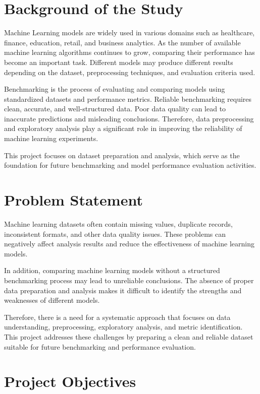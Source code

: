 \documentclass[12pt,a4paper]{report}
\begin{document}
\section{Background of the Study}

Machine Learning models are widely used in various domains such as healthcare, finance, education, retail, and business analytics. As the number of available machine learning algorithms continues to grow, comparing their performance has become an important task. Different models may produce different results depending on the dataset, preprocessing techniques, and evaluation criteria used.

Benchmarking is the process of evaluating and comparing models using standardized datasets and performance metrics. Reliable benchmarking requires clean, accurate, and well-structured data. Poor data quality can lead to inaccurate predictions and misleading conclusions. Therefore, data preprocessing and exploratory analysis play a significant role in improving the reliability of machine learning experiments.

This project focuses on dataset preparation and analysis, which serve as the foundation for future benchmarking and model performance evaluation activities.

\section{Problem Statement}

Machine learning datasets often contain missing values, duplicate records, inconsistent formats, and other data quality issues. These problems can negatively affect analysis results and reduce the effectiveness of machine learning models.

In addition, comparing machine learning models without a structured benchmarking process may lead to unreliable conclusions. The absence of proper data preparation and analysis makes it difficult to identify the strengths and weaknesses of different models.

Therefore, there is a need for a systematic approach that focuses on data understanding, preprocessing, exploratory analysis, and metric identification. This project addresses these challenges by preparing a clean and reliable dataset suitable for future benchmarking and performance evaluation.

\section{Project Objectives}
\end{document}
